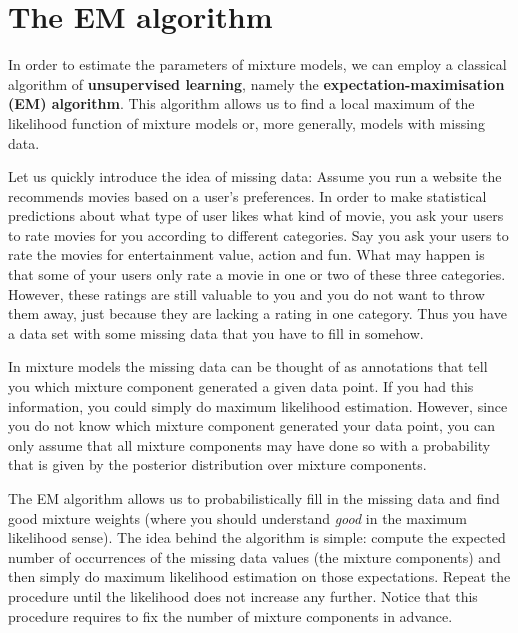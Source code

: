 \section{The EM algorithm}

In order to estimate the parameters of mixture models, we can employ a classical algorithm of 
\textbf{unsupervised learning}, namely the \textbf{expectation-maximisation (EM) algorithm}. This
algorithm allows us to find a local maximum of the likelihood function of mixture models or, more
generally, models with missing data. 

Let us quickly introduce the idea of missing data: Assume you run a website the recommends movies
based on a user's preferences. In order to make statistical predictions about what type of user
likes what kind of movie, you ask your users to rate movies for you according to different categories.
Say you ask your users to rate the movies for entertainment value, action and fun. What may happen is
that some of your users only rate a movie in one or two of these three categories. However, these
ratings are still valuable to you and you do not want to throw them away, just because they are lacking
a rating in one category. Thus you have a data set with some missing data that you have to fill in somehow.

In mixture models the missing data can be thought of as annotations that tell you which mixture component
generated a given data point. If you had this information, you could simply do maximum likelihood estimation.
However, since you do not know which mixture component generated your data point, you can only
assume that all mixture components may have done so with a probability that is given by the posterior distribution
over mixture components.

The EM algorithm allows us to probabilistically fill in the missing data and find good mixture weights
(where you should understand \textit{good} in the maximum likelihood sense). The idea behind the
algorithm is simple: compute the expected number of occurrences of the missing data values (the mixture 
components) and then simply do maximum likelihood estimation on those expectations. Repeat the procedure 
until the likelihood does not increase any further. Notice that this procedure requires to
fix the number of mixture components in advance.

